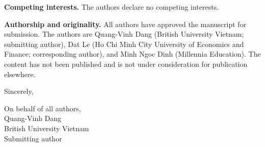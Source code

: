 \documentclass[11pt,a4paper]{article}
\begin{document}
\textbf{Competing interests.} The authors declare no competing interests.

\textbf{Authorship and originality.} All authors have approved the manuscript for submission. The authors are Quang-Vinh Dang (British University Vietnam; submitting author), Dat Le (Ho Chi Minh City University of Economics and Finance; corresponding author), and Minh Ngoc Dinh (Millennia Education). The content has not been published and is not under consideration for publication elsewhere.

Sincerely,

On behalf of all authors, \\
Quang-Vinh Dang \\
British University Vietnam \\
Submitting author
\end{document}

